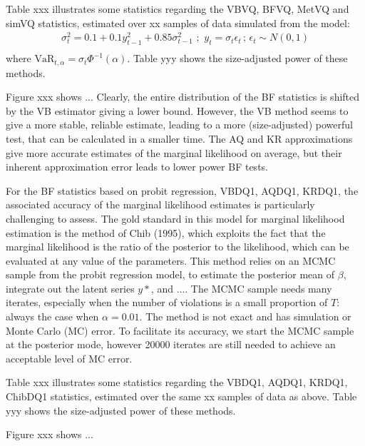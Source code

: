 \documentclass[12pt,epsf]{article}
\begin{document}
Table xxx illustrates some statistics regarding the VBVQ, BFVQ, MetVQ and simVQ statistics, estimated over xx samples of data simulated
from the model:
\begin{eqnarray*}
\sigma_t^2 = 0.1 + 0.1y_{t-1}^2 + 0.85\sigma_{t-1}^2 \,\,;\,\, y_t = \sigma_t \epsilon_t \,;\, \epsilon_t \sim N(0,1) \\
\end{eqnarray*}
where $\mbox{VaR}_{t,\alpha} = \sigma_t \Phi^{-1}(\alpha)$. Table yyy shows the size-adjusted power of these methods.

Figure xxx  shows ...  Clearly, the entire distribution of the BF statistics is shifted by the VB estimator giving a lower bound.
However, the VB method seems to give a more stable, reliable estimate, leading to a more (size-adjusted) powerful test, that can be calculated
in a smaller time. The AQ and KR approximations give more accurate estimates of the marginal likelihood on average, but their inherent
approximation error leads to lower power BF tests.



For the BF statistics based on probit regression, VBDQ1, AQDQ1, KRDQ1, the associated accuracy of the marginal likelihood estimates is
particularly challenging to assess. The gold standard in this model for marginal likelihood estimation is the method of Chib (1995), which
exploits the fact that the marginal likelihood is the ratio of the posterior to the likelihood, which can be evaluated at any value of
the parameters. This method relies on an MCMC sample from the probit regression model, to estimate the posterior mean of $\beta$, integrate out
the latent series $y*$, and .... The MCMC sample needs many iterates, especially when the number of violations is a small proportion
of $T$: always the case when $\alpha=0.01$. The method is not exact and has simulation or Monte Carlo (MC) error. To facilitate its accuracy,
we start the MCMC sample at the posterior mode, however 20000 iterates are still needed to achieve an acceptable level of MC error.

Table xxx illustrates some statistics regarding the VBDQ1, AQDQ1, KRDQ1, ChibDQ1 statistics, estimated over the same xx samples of data as above.
Table yyy shows the size-adjusted power of these methods.

Figure xxx  shows ...



\end{document}

